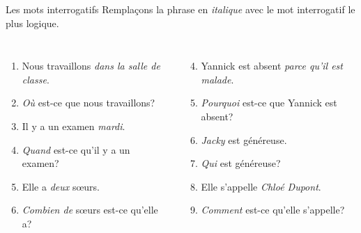 \begin{frame}{Les mots interrogatifs}
  Remplaçons la phrase en \emph{italique} avec le mot interrogatif le plus logique. \\
  \begin{columns}[t]
      \begin{enumerate}
        \item Nous travaillons \emph{dans la salle de classe}.
        \item<2->[$\to$] \emph{Où} est-ce que nous travaillons?
        \item Il y a un examen \emph{mardi}.
        \item<3->[$\to$] \emph{Quand} est-ce qu'il y a un examen?
        \item Elle a \emph{deux} sœurs.
        \item<4->[$\to$] \emph{Combien de} sœurs est-ce qu'elle a?
      \end{enumerate}
      \begin{enumerate}
        \setcounter{enumi}{3}
        \item Yannick est absent \emph{parce qu'il est malade}.
        \item<5->[$\to$] \emph{Pourquoi} est-ce que Yannick est absent?
        \item \emph{Jacky} est généreuse.
        \item<6->[$\to$] \emph{Qui} est généreuse?
        \item Elle s'appelle \emph{Chloé Dupont}.
        \item<7->[$\to$] \emph{Comment} est-ce qu'elle s'appelle?
      \end{enumerate}
  \end{columns}
\end{frame}